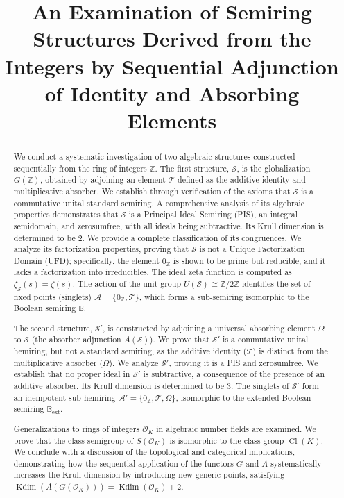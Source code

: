 \documentclass[11pt, a4paper]{article}
\title{An Examination of Semiring Structures Derived from the Integers by Sequential Adjunction of Identity and Absorbing Elements}
\author{}
\date{}
\theoremstyle{plain}
\theoremstyle{definition}
\numberwithin{equation}{section}
\newcommand{\Z}{\mathbb{Z}}
\newcommand{\Tobj}{\mathcal{T}} %
\newcommand{\OmegaObj}{\Omega} %
\newcommand{\SemiringS}{\mathcal{S}}
\newcommand{\SemiringSPrime}{\mathcal{S}'}
\newcommand{\Ztwo}{\mathbb{Z}/2\mathbb{Z}}
\newcommand{\Bool}{\mathbb{B}} %
\newcommand{\BoolExt}{\mathbb{B}_{\mathrm{ext}}} %
\DeclareMathOperator{\KrullDim}{Kdim}
\DeclareMathOperator{\Cl}{Cl}
\newcommand{\OK}{\mathcal{O}_K}
\newcommand{\SOK}{S(\OK)}
\newcommand{\SetA}{\mathcal{A}}
\newcommand{\SetAPrime}{\mathcal{A}'}
\begin{document}
\maketitle

\begin{abstract}
We conduct a systematic investigation of two algebraic structures constructed sequentially from the ring of integers $\Z$. The first structure, $\SemiringS$, is the globalization $G(\Z)$, obtained by adjoining an element $\Tobj$ defined as the additive identity and multiplicative absorber. We establish through verification of the axioms that $\SemiringS$ is a commutative unital standard semiring. A comprehensive analysis of its algebraic properties demonstrates that $\SemiringS$ is a Principal Ideal Semiring (PIS), an integral semidomain, and zerosumfree, with all ideals being subtractive. Its Krull dimension is determined to be 2. We provide a complete classification of its congruences. We analyze its factorization properties, proving that $\SemiringS$ is not a Unique Factorization Domain (UFD); specifically, the element $0_{\Z}$ is shown to be prime but reducible, and it lacks a factorization into irreducibles. The ideal zeta function is computed as $\zeta_{\SemiringS}(s)=\zeta(s)$. The action of the unit group $U(\SemiringS) \cong \Ztwo$ identifies the set of fixed points (singlets) $\SetA = \{0_{\Z}, \Tobj\}$, which forms a sub-semiring isomorphic to the Boolean semiring $\Bool$.

The second structure, $\SemiringSPrime$, is constructed by adjoining a universal absorbing element $\OmegaObj$ to $\SemiringS$ (the absorber adjunction $A(\SemiringS)$). We prove that $\SemiringSPrime$ is a commutative unital hemiring, but not a standard semiring, as the additive identity ($\Tobj$) is distinct from the multiplicative absorber ($\OmegaObj$). We analyze $\SemiringSPrime$, proving it is a PIS and zerosumfree. We establish that no proper ideal in $\SemiringSPrime$ is subtractive, a consequence of the presence of an additive absorber. Its Krull dimension is determined to be 3. The singlets of $\SemiringSPrime$ form an idempotent sub-hemiring $\SetAPrime=\{0_{\Z}, \Tobj, \OmegaObj\}$, isomorphic to the extended Boolean semiring $\BoolExt$.

Generalizations to rings of integers $\OK$ in algebraic number fields are examined. We prove that the class semigroup of $\SOK$ is isomorphic to the class group $\Cl(K)$. We conclude with a discussion of the topological and categorical implications, demonstrating how the sequential application of the functors $G$ and $A$ systematically increases the Krull dimension by introducing new generic points, satisfying $\KrullDim(A(G(\OK))) = \KrullDim(\OK)+2$.
\end{abstract}
\end{document}
